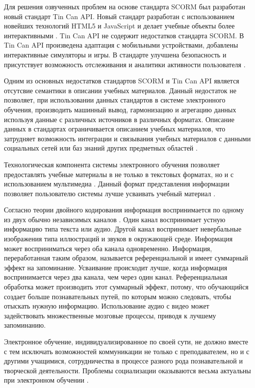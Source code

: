 Для решения озвученных проблем на основе стандарта SCORM был разработан новый стандарт Tin Can API. Новый стандарт разработан с использованием новейших технологий HTML5 и JavaScript и делает учебные объекты более интерактивными \cite{poltrack2012next}. Tin Can API не содержит недостатков стандарта SCORM. В Tin Can API произведена адаптация с мобильными устройствами, добавлены интерактивные симуляторы и игры. В стандарте улучшена безопасность и присутствует возможность отслеживания и аналитики активности пользователя \cite{regan2013training}. 

Одним из основных недостатков стандартов SCORM и Tin Can API является отсутсвие семантики в описании учебных материалов. Данный недостаток не позволяет, при использовании данных стандартов в системе электронного обучения, производить машинный вывод, гармонизацию и агрегацию данных используя данные с различных источников в различных форматах. Описание данных в стандартах ограничивается описанием учебных материалов, что затрудняет возможность интеграции и связывания учебных материалов с данными социальных сетей или баз знаний других предметных областей \cite{del2013learning}.   


Технологическая компонента системы электронного обучения позволяет предоставлять учебные материалы в не только в текстовых форматах, но и с использованием мультимедиа \cite{schlosser2009distance}. Данный формат представления информации позволяет пользователю системы лучше усваивать учебный материал \cite{moore2011distance}.

Согласно теории двойного кодирования информация воспринимается по одному из двух обычно независимых каналов \cite{monahova2013multi}. Один канал воспринимает устную информацию типа текста или аудио. Другой канал воспринимает невербальные изображения типа иллюстраций и звуков в окружающей среде. Информация может восприниматься через оба канала одновременно. Информация, переработанная таким образом, называется референциальной и имеет суммарный эффект на запоминание. Усваивание происходит лучше, когда информация воспринимается через два канала, чем через один канал. Референциальная обработка может производить этот суммарный эффект, потому, что обучающийся создает больше познавательных путей, по которым можно следовать, чтобы отыскать нужную информацию. Использование аудио с видео может задействовать множественные мозговые процессы, приводя к лучшему запоминанию.

Электронное обучение, индивидуализированное по своей сути, не должно вместе с тем исключать возможностей коммуникации не только с преподавателем, но и с другими учащимися, сотрудничества в процессе разного рода познавательной и творческой деятельности. Проблемы социализации оказываются весьма актуальны при электронном обучении \cite{hu2013revised}. 

